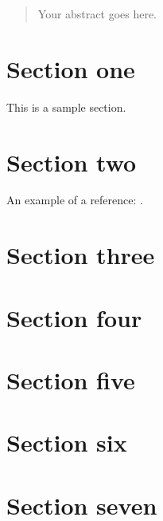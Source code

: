 \documentclass[11pt]{article} %
\theoremstyle{plain}
\theoremstyle{definition}
\begin{document}








\begin{abstract}
  Your abstract goes here.
\end{abstract}

\section{Section one}

This is a sample section.

\section{Section two}

An example of a reference:
\cite{hastie/etal:2009}.

\section{Section three}
\section{Section four}
\section{Section five}
\section{Section six}
\section{Section seven}



\end{document}
